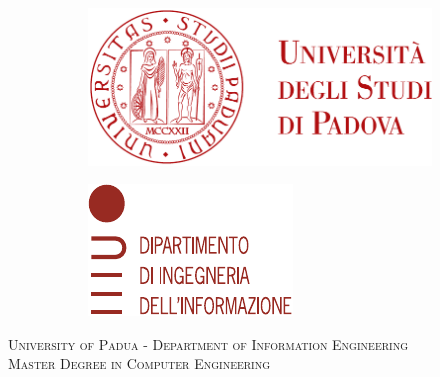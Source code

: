 \begin{titlepage}
        \begin{figure}
            \centering
            \begin{subfigure}[b]{0.4\textwidth}
                \includegraphics[width=\textwidth]{Immagini/logo_unipd}
            \end{subfigure}
            \hfill
            \begin{subfigure}[b]{0.3\textwidth}
                \includegraphics[width=\textwidth]{Immagini/logo_dei}
            \end{subfigure}
        \end{figure}
    
    
        \begin{center}
            \makeatletter %

            \textsc{\large University of Padua - Department of Information Engineering}\\
            \textsc{\large Master Degree in Computer Engineering}
    

\end{center}
\end{titlepage}
